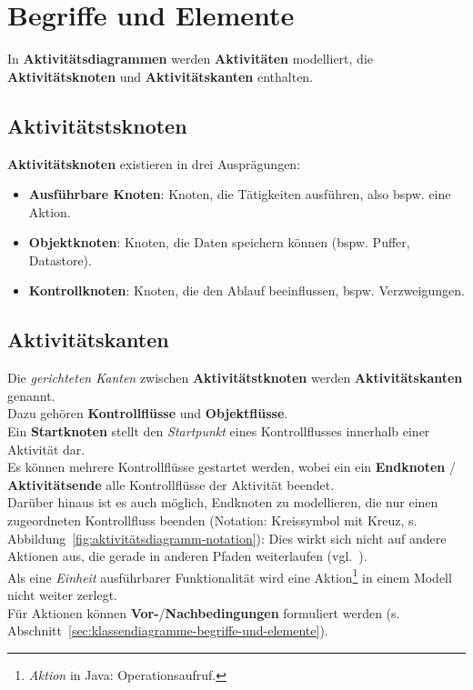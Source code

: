 \section{Begriffe und Elemente}

In \textbf{Aktivitätsdiagrammen} werden \textbf{Aktivitäten} modelliert, die \textbf{Aktivitätsknoten} und \textbf{Aktivitätskanten} enthalten.

\subsection{Aktivitätstsknoten}

\textbf{Aktivitätsknoten} existieren in drei Ausprägungen:

\begin{itemize}
    \item \textbf{Ausführbare Knoten}: Knoten, die Tätigkeiten ausführen, also bspw. eine Aktion.
    \item \textbf{Objektknoten}: Knoten, die Daten speichern können (bspw. Puffer, Datastore).
    \item \textbf{Kontrollknoten}: Knoten, die den Ablauf beeinflussen, bspw. Verzweigungen.
\end{itemize}

\subsection{Aktivitätskanten}
Die \textit{gerichteten Kanten} zwischen \textbf{Aktivitätstknoten}  werden \textbf{Aktivitätskanten} genannt.\\
Dazu gehören \textbf{Kontrollflüsse} und \textbf{Objektflüsse}.\\

\noindent
Ein \textbf{Startknoten} stellt den \textit{Startpunkt} eines Kontrollflusses innerhalb einer Aktivität dar.\\
Es können mehrere Kontrollflüsse gestartet werden, wobei ein ein \textbf{Endknoten} / \textbf{Aktivitätsende} alle Kontrollflüsse der Aktivität beendet.\\

Darüber hinaus ist es auch möglich, Endknoten zu modellieren, die nur einen zugeordneten Kontrollfluss beenden (Notation: Kreissymbol mit Kreuz, s. Abbildung~\ref{fig:aktivitätsdiagramm-notation}): Dies wirkt sich nicht auf andere Aktionen aus, die gerade in anderen Pfaden weiterlaufen (vgl.~\cite[72]{Bal05}).\\

\noindent
Als eine \textit{Einheit} ausführbarer Funktionalität wird eine Aktion\footnote{
\textit{Aktion} in Java: Operationsaufruf.
} in einem Modell nicht weiter zerlegt.\\
Für Aktionen können \textbf{Vor-}/\textbf{Nachbedingungen} formuliert werden (s. Abschnitt~\ref{sec:klassendiagramme-begriffe-und-elemente}).


